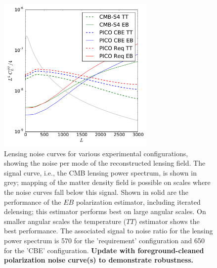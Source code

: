 \documentclass[PICOReport.tex]{subfiles}
\begin{document}

\begin{figure}
\hspace{-0.in}
\parbox{3.1in}{\centerline {
\includegraphics[width=3.0in]{images/lensingNoisePICO.pdf} } }
\hspace{0.in}
\parbox{3.5in}{
\caption{\label{fig:lensingNoisePICO} Lensing noise curves for various experimental configurations, showing the noise per mode of the reconstructed lensing field.  The signal curve, i.e., the CMB lensing power spectrum, is shown in grey; mapping of the matter density field is possible on scales where the noise curves fall below this signal.  Shown in solid are the performance of the $EB$ polarization estimator, including iterated delensing; this estimator performs best on large angular scales.  On smaller angular scales the temperature ($TT$) estimator shows the best performance. The associated signal to noise ratio for the lensing power spectrum is 570 for the 'requirement' configuration and 650 for the 'CBE' configuration. \textbf{Update with foreground-cleaned polarization noise curve(s) to demonstrate robustness.} } }
\vspace{-0.1in}
\end{figure}


\end{document}
